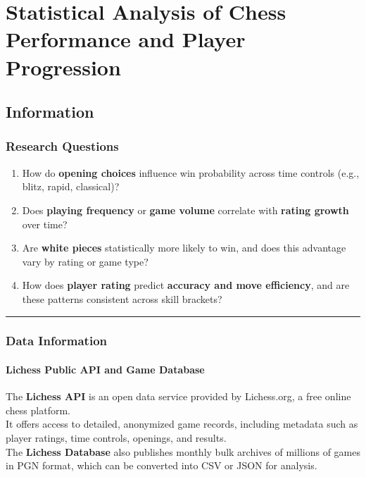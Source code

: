 \documentclass[
]{article}
\author{Tina Huynh}
\date{2025-10-16}
\providecommand{\tightlist}{%
  \setlength{\itemsep}{0pt}\setlength{\parskip}{0pt}}
\begin{document}
{
\setcounter{tocdepth}{2}
\tableofcontents
}
\section{Statistical Analysis of Chess Performance and Player
Progression}\label{statistical-analysis-of-chess-performance-and-player-progression}

\subsection{Information}\label{information}

\subsubsection{Research Questions}\label{research-questions}

\begin{enumerate}
\def\labelenumi{\arabic{enumi}.}
\tightlist
\item
  How do \textbf{opening choices} influence win probability across time
  controls (e.g., blitz, rapid, classical)?
\item
  Does \textbf{playing frequency} or \textbf{game volume} correlate with
  \textbf{rating growth} over time?
\item
  Are \textbf{white pieces} statistically more likely to win, and does
  this advantage vary by rating or game type?
\item
  How does \textbf{player rating} predict \textbf{accuracy and move
  efficiency}, and are these patterns consistent across skill brackets?
\end{enumerate}

\begin{center}\rule{0.5\linewidth}{0.5pt}\end{center}

\subsubsection{Data Information}\label{data-information}

\paragraph{Lichess Public API and Game
Database}\label{lichess-public-api-and-game-database}

The \textbf{Lichess API} is an open data service provided by
Lichess.org, a free online chess platform.\\
It offers access to detailed, anonymized game records, including
metadata such as player ratings, time controls, openings, and results.\\
The \textbf{Lichess Database} also publishes monthly bulk archives of
millions of games in PGN format, which can be converted into CSV or JSON
for analysis.
\end{document}
